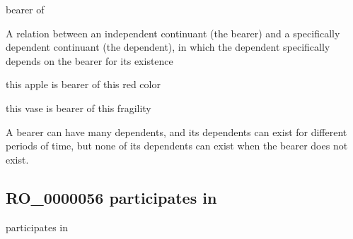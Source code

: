 \documentclass[letterpaper,10pt,english]{sphinxmanual}
\begin{document}
\begin{sphinxShadowBox}

\sphinxAtStartPar
bearer of
\end{sphinxShadowBox}

\begin{sphinxShadowBox}

\sphinxAtStartPar
{}
\end{sphinxShadowBox}

\begin{sphinxShadowBox}

\sphinxAtStartPar
A relation between an independent continuant (the bearer) and a specifically dependent continuant (the dependent), in which the dependent specifically depends on the bearer for its existence
\end{sphinxShadowBox}

\begin{sphinxShadowBox}

\sphinxAtStartPar
this apple is bearer of this red color

\sphinxAtStartPar
this vase is bearer of this fragility
\end{sphinxShadowBox}

\begin{sphinxShadowBox}

\sphinxAtStartPar
A bearer can have many dependents, and its dependents can exist for different periods of time, but none of its dependents can exist when the bearer does not exist.
\end{sphinxShadowBox}

\begin{sphinxShadowBox}

\sphinxAtStartPar
{}
\end{sphinxShadowBox}
\begin{quote}

\ignorespaces \end{quote}


\subsection{RO\_0000056 \sphinxhyphen{} participates in}
\label{\detokenize{doc-RO_0000056:ro-0000056-participates-in}}\label{\detokenize{doc-RO_0000056:index-0}}\label{\detokenize{doc-RO_0000056::doc}}
\begin{sphinxShadowBox}

\sphinxAtStartPar
participates in
\end{sphinxShadowBox}
\end{document}
